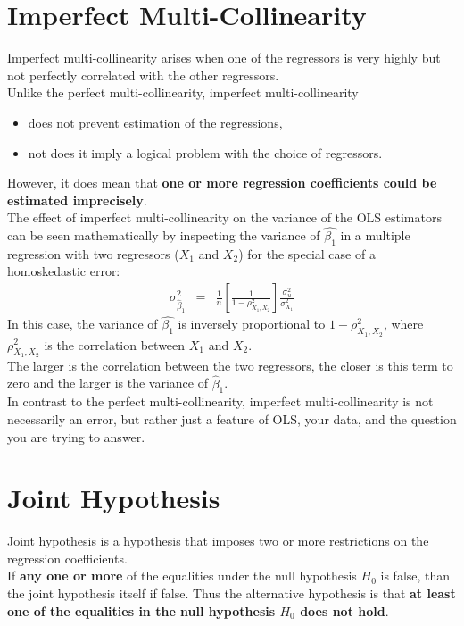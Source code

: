 \section{Imperfect Multi-Collinearity}
Imperfect multi-collinearity arises when one of the regressors is very highly but not perfectly correlated with the other regressors.\\
Unlike the perfect multi-collinearity, imperfect multi-collinearity
\begin{itemize}
	\item does not prevent estimation of the regressions,
	\item not does it imply a logical problem with the choice of regressors. 
\end{itemize}
However, it does mean that \textbf{\color{blue}one or more regression coefficients could be estimated imprecisely}.\\
The effect of imperfect multi-collinearity on the variance of the OLS estimators can be seen mathematically by inspecting the variance of $\hat{\beta_{1}}$ in a multiple regression with two regressors ($X_{1}$ and $X_{2}$) for the special case of a homoskedastic error:
\begin{eqnarray}
\sigma_{\hat{\beta}_{1}}^{2} &=& \frac{1}{n}\left[\frac{1}{1 - \rho_{X_{1}, X_{2}}^{2}}\right]\frac{\sigma_{u}^{2}}{\sigma_{X_{1}}^{2}}
\end{eqnarray}
In this case, the variance of $\hat{\beta_{1}}$ is inversely proportional to $1 - \rho_{X_{1}, X_{2}}^{2}$, where $\rho_{X_{1}, X_{2}}^{2}$ is the correlation between $X_{1}$ and $X_{2}$.\\
The larger is the correlation between the two regressors, the closer is this term to zero and the larger is the variance of $\hat{\beta}_{1}$.\\
In contrast to the perfect multi-collinearity, imperfect multi-collinearity is not necessarily an error, but rather just a feature of OLS, your data, and the question you are trying to answer.

\section{Joint Hypothesis}
Joint hypothesis is a hypothesis that imposes two or more restrictions on the regression coefficients.\\
If \textbf{\color{red}any one or more} of the equalities under the null hypothesis $H_{0}$ is false, than the joint hypothesis itself if false. Thus the alternative hypothesis is that \textbf{\color{red}at least one \color{blue}of the equalities in the null hypothesis $H_{0}$ does not hold}.

